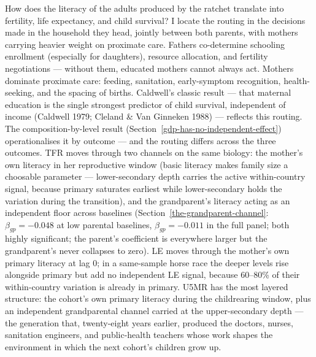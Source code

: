 \documentclass[12pt,letterpaper]{article}
\begin{document}
How does the literacy of the adults produced by the ratchet translate
into fertility, life expectancy, and child survival? I locate the
routing in the decisions made in the household they head, jointly
between both parents, with mothers carrying heavier weight on
proximate care.
Fathers co-determine schooling enrollment (especially for daughters),
resource allocation, and fertility negotiations --- without them,
educated mothers cannot always act. Mothers dominate proximate care:
feeding, sanitation, early-symptom recognition, health-seeking, and
the spacing of births. Caldwell's classic result --- that maternal
education is the single strongest predictor of child survival,
independent of income (Caldwell 1979; Cleland \& Van Ginneken 1988) ---
reflects this routing. The composition-by-level result
(Section~\ref{gdp-has-no-independent-effect}) operationalises it by
outcome --- and the routing differs across the three outcomes.
TFR moves through two channels on the same biology: the mother's own
literacy in her reproductive window (basic literacy makes family size
a choosable parameter --- lower-secondary depth carries the active
within-country signal, because primary saturates earliest
while lower-secondary holds the variation during the transition), and
the grandparent's literacy acting as an independent floor across
baselines (Section~\ref{the-grandparent-channel}: $\beta_{gp}=-0.048$
at low parental baselines, $\beta_{gp}=-0.011$ in the full panel;
both highly significant; the parent's coefficient is everywhere
larger but the grandparent's never collapses to zero). LE moves through the mother's own primary
literacy at lag 0; in a same-sample horse race the deeper levels rise
alongside primary but add no independent LE signal, because 60--80\%
of their within-country variation is already in primary. U5MR has the
most layered structure: the cohort's own primary literacy during the
childrearing window, plus an independent grandparental channel
carried at the upper-secondary depth --- the generation that, twenty-eight
years earlier, produced the doctors, nurses, sanitation engineers,
and public-health teachers whose work shapes the environment in which
the next cohort's children grow up.
\end{document}
